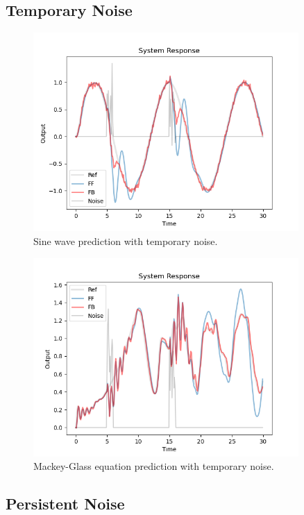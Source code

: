 \documentclass[12pt, a4paper]{article}
\begin{document}
\subsection*{Temporary Noise}

\begin{figure}[H]
    \centering
    \includegraphics[width=0.9\textwidth]{fig/sin_lin_rec.png}
    \caption{Sine wave prediction with temporary noise.}
    \label{fig:1}
\end{figure}

\begin{figure}[H]
    \centering
    \includegraphics[width=0.9\textwidth]{fig/MG_lin_rec.png}
    \caption{Mackey-Glass equation prediction with temporary noise.}
    \label{fig:2}
\end{figure}

\subsection*{Persistent Noise}
\end{document}
